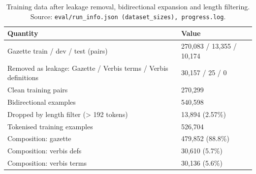 \begin{table}[t]
\centering
\small
\begin{tabular}{ll}
\toprule
Quantity & Value \\
\midrule
Gazette train / dev / test (pairs) & 270,083 / 13,355 / 10,174 \\
Removed as leakage: Gazette / Verbis terms / Verbis definitions & 30,157 / 25 / 0 \\
Clean training pairs & 270,299 \\
Bidirectional examples & 540,598 \\
Dropped by length filter (> 192 tokens) & 13,894 (2.57\%) \\
Tokenised training examples & 526,704 \\
Composition: gazette & 479,852 (88.8\%) \\
Composition: verbis defs & 30,610 (5.7\%) \\
Composition: verbis terms & 30,136 (5.6\%) \\
\bottomrule
\end{tabular}
\caption{Training data after leakage removal, bidirectional expansion and length filtering. Source: \texttt{eval/run\_info.json (dataset\_sizes), progress.log}.}
\label{tab:e01-data}
\end{table}
